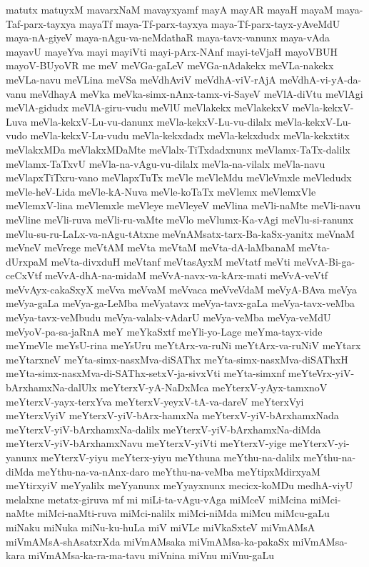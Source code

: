 {matutx
matuyxM
mavarxNaM
mavayxyamf
mayA
mayAR
mayaH
mayaM
maya-Taf-parx-tayxya
mayaTf
maya-Tf-parx-tayxya
maya-Tf-parx-tayx-yAveMdU
maya-nA-giyeV
maya-nAgu-va-neMdathaR
maya-tavx-vanunx
maya-vAda
mayavU
mayeYva
mayi
mayiVti
mayi-pArx-NAnf
mayi-teVjaH
mayoVBUH
mayoV-BUyoVR
me
meV
meVGa-gaLeV
meVGa-nAdakekx
meVLa-nakekx
meVLa-navu
meVLina
meVSa
meVdhAviV
meVdhA-viV-rAjA
meVdhA-vi-yA-da-vanu
meVdhayA
meVka
meVka-simx-nAnx-tamx-vi-SayeV
meVlA-diVtu
meVlAgi
meVlA-gidudx
meVlA-giru-vudu
meVlU
meVlakekx
meVlakekxV
meVla-kekxV-Luva
meVla-kekxV-Lu-vu-danunx
meVla-kekxV-Lu-vu-dilalx
meVla-kekxV-Lu-vudo
meVla-kekxV-Lu-vudu
meVla-kekxdadx
meVla-kekxdudx
meVla-kekxtitx
meVlakxMDa
meVlakxMDaMte
meVlalx-TiTxdadxnunx
meVlamx-TaTx-dalilx
meVlamx-TaTxvU
meVla-na-vAgu-vu-dilalx
meVla-na-vilalx
meVla-navu
meVlapxTiTxru-vano
meVlapxTuTx
meVle
meVleMdu
meVleVmxle
meVledudx
meVle-heV-Lida
meVle-kA-Nuva
meVle-koTaTx
meVlemx
meVlemxVle
meVlemxV-lina
meVlemxle
meVleye
meVleyeV
meVlina
meVli-naMte
meVli-navu
meVline
meVli-ruva
meVli-ru-vaMte
meVlo
meVlumx-Ka-vAgi
meVlu-si-ranunx
meVlu-su-ru-LaLx-va-nAgu-tAtxne
meVnAMsatx-tarx-Ba-kaSx-yanitx
meVnaM
meVneV
meVrege
meVtAM
meVta
meVtaM
meVta-dA-laMbanaM
meVta-dUrxpaM
meVta-divxduH
meVtanf
meVtasAyxM
meVtatf
meVti
meVvA-Bi-ga-ceCxVtf
meVvA-dhA-na-midaM
meVvA-navx-va-kArx-mati
meVvA-veVtf
meVvAyx-cakaSxyX
meVva
meVvaM
meVvaca
meVveVdaM
meVyA-BAva
meVya
meVya-gaLa
meVya-ga-LeMba
meVyatavx
meVya-tavx-gaLa
meVya-tavx-veMba
meVya-tavx-veMbudu
meVya-valalx-vAdarU
meVya-veMba
meVya-veMdU
meVyoV-pa-sa-jaRnA
meY
meYkaSxtf
meYli-yo-Lage
meYma-tayx-vide
meYmeVle
meYsU-rina
meYsUru
meYtArx-va-ruNi
meYtArx-va-ruNiV
meYtarx
meYtarxneV
meYta-simx-nasxMva-diSAThx
meYta-simx-nasxMva-diSAThxH
meYta-simx-nasxMva-di-SAThx-setxV-ja-sivxVti
meYta-simxnf
meYteVrx-yiV-bArxhamxNa-dalUlx
meYterxV-yA-NaDxMca
meYterxV-yAyx-tamxnoV
meYterxV-yayx-terxYva
meYterxV-yeyxV-tA-va-dareV
meYterxVyi
meYterxVyiV
meYterxV-yiV-bArx-hamxNa
meYterxV-yiV-bArxhamxNada
meYterxV-yiV-bArxhamxNa-dalilx
meYterxV-yiV-bArxhamxNa-diMda
meYterxV-yiV-bArxhamxNavu
meYterxV-yiVti
meYterxV-yige
meYterxV-yi-yanunx
meYterxV-yiyu
meYterx-yiyu
meYthuna
meYthu-na-dalilx
meYthu-na-diMda
meYthu-na-va-nAnx-daro
meYthu-na-veMba
meYtipxMdirxyaM
meYtirxyiV
meYyalilx
meYyanunx
meYyayxnunx
mecicx-koMDu
medhA-viyU
melalxne
metatx-giruva
mf
mi
miLi-ta-vAgu-vAga
miMceV
miMcina
miMci-naMte
miMci-naMti-ruva
miMci-nalilx
miMci-niMda
miMcu
miMcu-gaLu
miNaku
miNuka
miNu-ku-huLa
miV
miVLe
miVkaSxteV
miVmAMsA
miVmAMsA-shAsatxrXda
miVmAMsaka
miVmAMsa-ka-pakaSx
miVmAMsa-kara
miVmAMsa-ka-ra-ma-tavu
miVnina
miVnu
miVnu-gaLu
}
